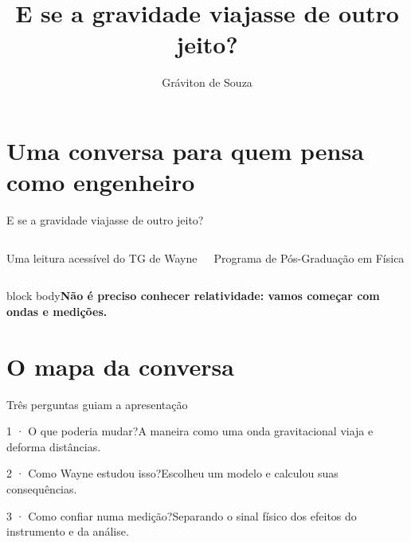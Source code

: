 \documentclass[aspectratio=169,11pt]{beamer}
\title{E se a gravidade viajasse de outro jeito?}
\author{Gráviton de Souza}
\date{}
\newcommand{\key}[1]{\par\vspace{3mm}\begin{beamercolorbox}[sep=3mm,wd=\linewidth]{block body}\textbf{#1}\end{beamercolorbox}}
\newcommand{\card}[2]{\begin{block}{#1}#2\end{block}}
\begin{document}
\section{Uma conversa para quem pensa como engenheiro}
\begin{frame}{E se a gravidade viajasse de outro jeito?}
\begin{columns}\par\vspace{5mm}Uma leitura acessível do TG de Wayne\par{}\par\small Programa de Pós-Graduação em Física
\centering{}\end{columns}\key{Não é preciso conhecer relatividade: vamos começar com ondas e medições.}
\end{frame}
\section{O mapa da conversa}
\begin{frame}{Três perguntas guiam a apresentação}
\card{1 · O que poderia mudar?}{A maneira como uma onda gravitacional viaja e deforma distâncias.}\card{2 · Como Wayne estudou isso?}{Escolheu um modelo e calculou suas consequências.}\card{3 · Como confiar numa medição?}{Separando o sinal físico dos efeitos do instrumento e da análise.}
\end{frame}
\end{document}

